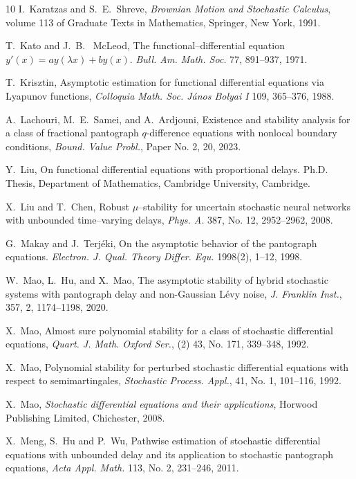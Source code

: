 \documentclass[a4paper,10pt,reqno]{amsart}
\numberwithin{equation}{section}
\theoremstyle{definition}
\theoremstyle{remark}
\DeclareMathOperator{\1}{\mathbbm 1}
\begin{document}
\begin{thebibliography}{10}
I.~Karatzas and S.~E.~Shreve, {\em Brownian  Motion and Stochastic Calculus}, volume 113 of
Graduate Texts in Mathematics, Springer, New York, 1991.


 T.~Kato and J.~B.~ McLeod, The functional--differential equation 
$y'(x) = ay(\lambda x) + by(x)$. {\em Bull. Am. Math.
	Soc.} 77, 891--937,  1971.

 T.~Krisztin, Asymptotic estimation for functional differential equations via Lyapunov functions, 
{\em Colloquia Math. Soc. J\'anos Bolyai I} 109, 365--376, 1988.

A.~Lachouri, M.~E.~Samei, and A.~Ardjouni, Existence and stability analysis for a class of fractional
pantograph {$q$}-difference equations with nonlocal boundary
conditions, {\em Bound. Value Probl.}, Paper No. 2, 20, 2023.

 Y.~Liu, On functional differential equations with proportional delays. Ph.D. Thesis, Department of Mathematics, Cambridge University, Cambridge.

X.~Liu and T.~Chen, Robust $\mu$--stability for uncertain stochastic neural networks with unbounded time--varying delays, {\em Phys. A.} 387, No. 12, 2952--2962, 2008. 

G.~Makay and J.~Terj\'eki, On the asymptotic behavior of the pantograph equations. {\em Electron. J. Qual. Theory Differ. Equ.} 1998(2), 1--12, 1998.

W.~Mao, L.~Hu, and X.~Mao, The asymptotic stability of hybrid stochastic systems with
pantograph delay and non-Gaussian L\'evy noise, {\em J. Franklin Inst.}, 357, 2, 1174--1198, 2020.

X.~Mao, Almost sure polynomial stability for a class of stochastic differential equations,
{\em Quart. J. Math. Oxford Ser.}, (2) 43, No. 171, 339--348, 1992.

 X.~Mao, Polynomial stability for perturbed stochastic differential equations with respect
to semimartingales, {\em Stochastic Process. Appl.},  41, No. 1, 101--116, 1992.

X.~Mao, {\em Stochastic differential equations and their applications}, Horwood Publishing Limited, Chichester, 2008. 

X.~Meng, S.~Hu and P.~Wu, Pathwise estimation of stochastic differential equations with unbounded delay and its application to stochastic pantograph equations, {\em Acta Appl. Math.} 113, No. 2, 231--246, 2011. 


\end{thebibliography}
\end{document}

